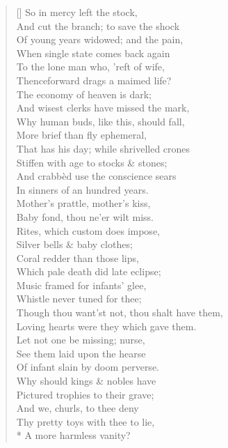 \documentclass[MAIN]{subfiles}
\begin{document}
\begin{verse}[\versewidth]
So in mercy left the stock,\\
And cut the branch; to save the shock\\
Of young years widowed; and the pain,\\
When single state comes back again\\
To the lone man who, 'reft of wife,\\
Thenceforward drags a maimed life?\\
The economy of heaven is dark;\\
And wisest clerks have missed the mark,\\
Why human buds, like this, should fall,\\
More brief than fly ephemeral,\\
That has his day; while shrivelled crones\\
Stiffen with age to stocks \& stones;\\
And crabb\`ed use the conscience sears\\
In sinners of an hundred years.\\
Mother's prattle, mother's kiss,\\
Baby fond, thou ne'er wilt miss.\\
Rites, which custom does impose,\\
Silver bells \& baby clothes;\\
Coral redder than those lips,\\
Which pale death did late eclipse;\\
Music framed for infants' glee,\\
Whistle never tuned for thee;\\
Though thou want'st not, thou shalt have them,\\
Loving hearts were they which gave them.\\
Let not one be missing; nurse,\\
See them laid upon the hearse\\
Of infant slain by doom perverse.\\
Why should kings \& nobles have\\
Pictured trophies to their grave;\\
And we, churls, to thee deny\\
Thy pretty toys with thee to lie,\\*
A more harmless vanity?
\end{verse}
\end{document}
